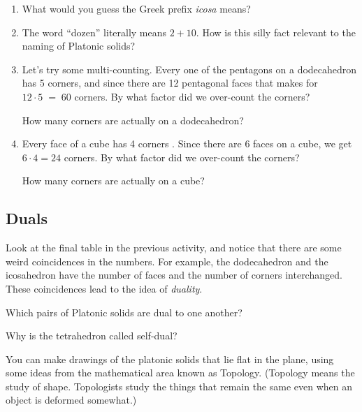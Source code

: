 \begin{enumerate}
    \item What would you guess the Greek prefix {\em icosa} means?
    
    \wbvfill
    
    \item The word ``dozen'' literally means $2+10$.  How is this silly fact relevant to the naming of Platonic solids?
 
     \wbvfill
       
    \item Let's try some multi-counting.  Every one of the pentagons on a dodecahedron has 5 corners, and since there are 12 pentagonal faces that makes for $12 \cdot 5 \; = \; 60$ corners.  By what factor did we over-count the corners? \underline{\hstrut}
    
    How many corners are actually on a dodecahedron? \underline{\hstrut}

    \wbvfill
        
    \item Every face of a cube has 4 corners .  Since there are 6 faces on a cube, we get 
    $6 \cdot 4 = 24$ corners.  By what factor did we over-count the corners? \underline{\hstrut}
    
    How many corners are actually on a cube? \underline{\hstrut}
    
    \wbvfill
    
\end{enumerate}

\newpage

\subsection{Duals}

Look at the final table in the previous activity, and notice that there are some weird coincidences in the numbers.  For example, the dodecahedron and the icosahedron have the number of faces and the number of corners interchanged.  These coincidences lead to the idea of {\em duality}.

Which pairs of Platonic solids are dual to one another?

\wbvfill

Why is the tetrahedron called self-dual?

\wbvfill

You can make drawings of the platonic solids that lie flat in the plane, using some ideas from the mathematical area known as Topology.
(Topology means the study of shape.  Topologists study the things that remain the same even when an object is deformed somewhat.)


